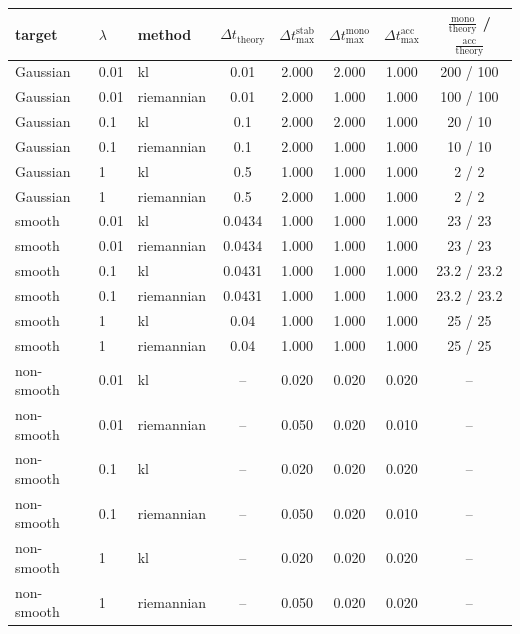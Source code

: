 \begin{tabular}{lllccccc}
\toprule
target & $\lambda$ & method & $\Delta t_{\mathrm{theory}}$ & $\Delta t_{\max}^{\mathrm{stab}}$ & $\Delta t_{\max}^{\mathrm{mono}}$ & $\Delta t_{\max}^{\mathrm{acc}}$ & $\tfrac{\mathrm{mono}}{\mathrm{theory}}$ / $\tfrac{\mathrm{acc}}{\mathrm{theory}}$ \\
\midrule
Gaussian & 0.01 & kl & 0.01 & 2.000 & 2.000 & 1.000 & 200 / 100 \\
Gaussian & 0.01 & riemannian & 0.01 & 2.000 & 1.000 & 1.000 & 100 / 100 \\
Gaussian & 0.1 & kl & 0.1 & 2.000 & 2.000 & 1.000 & 20 / 10 \\
Gaussian & 0.1 & riemannian & 0.1 & 2.000 & 1.000 & 1.000 & 10 / 10 \\
Gaussian & 1 & kl & 0.5 & 1.000 & 1.000 & 1.000 & 2 / 2 \\
Gaussian & 1 & riemannian & 0.5 & 2.000 & 1.000 & 1.000 & 2 / 2 \\
smooth & 0.01 & kl & 0.0434 & 1.000 & 1.000 & 1.000 & 23 / 23 \\
smooth & 0.01 & riemannian & 0.0434 & 1.000 & 1.000 & 1.000 & 23 / 23 \\
smooth & 0.1 & kl & 0.0431 & 1.000 & 1.000 & 1.000 & 23.2 / 23.2 \\
smooth & 0.1 & riemannian & 0.0431 & 1.000 & 1.000 & 1.000 & 23.2 / 23.2 \\
smooth & 1 & kl & 0.04 & 1.000 & 1.000 & 1.000 & 25 / 25 \\
smooth & 1 & riemannian & 0.04 & 1.000 & 1.000 & 1.000 & 25 / 25 \\
non-smooth & 0.01 & kl & -- & 0.020 & 0.020 & 0.020 & -- \\
non-smooth & 0.01 & riemannian & -- & 0.050 & 0.020 & 0.010 & -- \\
non-smooth & 0.1 & kl & -- & 0.020 & 0.020 & 0.020 & -- \\
non-smooth & 0.1 & riemannian & -- & 0.050 & 0.020 & 0.010 & -- \\
non-smooth & 1 & kl & -- & 0.020 & 0.020 & 0.020 & -- \\
non-smooth & 1 & riemannian & -- & 0.050 & 0.020 & 0.020 & -- \\
\bottomrule
\end{tabular}

